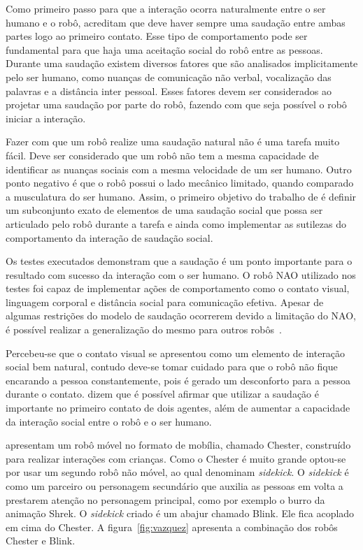 Como primeiro passo para que a interação ocorra naturalmente entre o ser humano e o robô,  acreditam que deve haver sempre uma saudação entre ambas partes logo ao primeiro contato. Esse tipo de comportamento pode ser fundamental para que haja uma aceitação social do robô entre as pessoas. Durante uma saudação existem diversos fatores que são analisados implicitamente pelo ser humano, como nuanças de comunicação não verbal, vocalização das palavras e a distância inter pessoal. Esses fatores devem ser considerados ao projetar uma saudação por parte do robô, fazendo com que seja possível o robô iniciar a interação.

Fazer com que um robô realize uma saudação natural não é uma tarefa muito fácil. Deve ser considerado que um robô não tem a mesma capacidade de identificar as nuanças sociais com a mesma velocidade de um ser humano. Outro ponto negativo é que o robô possui o lado mecânico limitado, quando comparado a musculatura do ser humano. Assim, o primeiro objetivo do trabalho de  é definir um subconjunto exato de elementos de uma saudação social que possa ser articulado pelo robô durante a tarefa e ainda como implementar as sutilezas do comportamento da interação de saudação social.

Os testes executados demonstram que a saudação é um ponto importante para o resultado com sucesso da interação com o ser humano. O robô NAO utilizado nos testes foi capaz de implementar ações de comportamento como o contato visual, linguagem corporal e distância social para comunicação efetiva. Apesar de algumas restrições do modelo de saudação ocorrerem devido a limitação do NAO, é possível realizar a generalização do mesmo para outros robôs~\cite{Heenan:2014}.

Percebeu-se que o contato visual se apresentou como um elemento de interação social bem natural, contudo deve-se tomar cuidado para que o robô não fique encarando a pessoa constantemente, pois é gerado um desconforto para a pessoa durante o contato.  dizem que é possível afirmar que utilizar a saudação é importante no primeiro contato de dois agentes, além de aumentar a capacidade da interação social entre o robô e o ser humano.

 apresentam um robô móvel no formato de mobília, chamado Chester, construído para realizar interações com crianças. Como o Chester é muito grande optou-se por usar um segundo robô não móvel, ao qual  denominam \emph{sidekick}. O \emph{sidekick} é como um parceiro ou personagem secundário que auxilia as pessoas em volta a prestarem atenção no personagem principal, como por exemplo o burro da animação Shrek. O \emph{sidekick} criado é um abajur chamado Blink. Ele fica acoplado em cima do Chester. A figura~\ref{fig:vazquez} apresenta a combinação dos robôs Chester e Blink.

